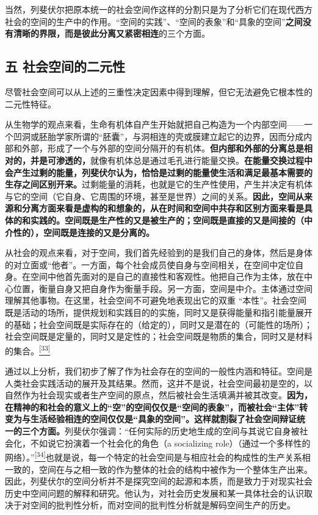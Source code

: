 \documentclass[UTF8, fontset = sourcesans, a4paper, oneside, zihao =
-4, scheme=chinese, no-math, space=true]{ctexbook}
\begin{document}
当然，列斐伏尔把原本统一的社会空间作这样的分割只是为了分析它们在现代西方社会的空间的生产中的作用。``空间的实践''、``空间的表象''和``具象的空间''\textbf{之间没有清晰的界限，而是彼此分离又紧密相连}的三个方面。

\subsection{五
社会空间的二元性}\label{part0006_split_002.htmlux5cux23c020}

尽管社会空间可以从上述的三重性决定因素中得到理解，但它无法避免它根本性的二元性特征。

从生物学的观点来看，生命有机体自产生开始就把自己构造为一个内部空间------一个凹洞或胚胎学家所谓的``胚囊''，与洞相连的壳或膜建立起它的边界，因而分成内部和外部，形成了一个与外部的空间分隔开的有机体。\textbf{但内部和外部的分离总是相对的，并是可渗透的，}就像有机体总是通过毛孔进行能量交换。\textbf{在能量交换过程中会产生过剩的能量，列斐伏尔认为，恰恰是过剩的能量使生活和满足最基本需要的生存之间区别开来。}过剩能量的消耗，也就是它的生产性使用，产生并决定有机体与它的空间（它自身、它周围的环境，甚至是世界）之间的关系。\textbf{因此，空间从来源和分离方面来看是虚构的和想象的，从在时间和空间中共存和区别方面来看是具体的和实践的。空间既是生产性的又是被生产的；空间既是直接的又是间接的（中介性的），空间既是连接的又是分离的。}

从社会的观点来看，对于空间，我们首先经验到的是我们自己的身体，然后是身体的对立面或``他者''。一方面，每个社会成员使自身与空间相关，在空间中定位自身。在空间中他首先面对的是自己的直接性和客观性。他把自己作为主体，放在中心位置，衡量自身又把自身作为衡量手段。另一方面，空间是中介。主体通过空间理解其他事物。在这里，社会空间不可避免地表现出它的双重
``本性''。社会空间既是活动的场所，提供规划和实践目的的实施，同时又是获得能量和指引能量展开的基础；社会空间既是实际存在的（给定的），同时又是潜在的（可能性的场所）；社会空间既是定量的，同时又是定性的；社会空间既是物质的集合，同时又是材料的集合。\protect\hypertarget{part0006_split_002.htmlux5cux23w33}{}{}\protect\hyperlink{part0006_split_003.htmlux5cux23m33}{\textsuperscript{{[}33{]}}}

通过以上分析，我们初步了解了作为社会存在的空间的一般性内涵和特征。空间是人类社会实践活动的展开及其结果。然而，这并不是说，社会空间最初是空的，以自然作为社会现实或者生产空间的原点，然后被社会生活填满并被其改变。\textbf{因为，在精神的和社会的意义上的``空''的空间仅仅是``空间的表象''，而被社会``主体''转变为与生活经验相连的空间仅仅是``具象的空间''。这样就割裂了社会空间辩证统一的三个方面。}列斐伏尔强调：``任何实际的历史地生成的空间与其说它自身被社会化，不如说它扮演着一个社会化的角色（a
socializing
role）（通过一个多样性的网络）。''\protect\hypertarget{part0006_split_002.htmlux5cux23w34}{}{}\protect\hyperlink{part0006_split_003.htmlux5cux23m34}{\textsuperscript{{[}34{]}}}也就是说，每一个特定的社会空间是与相应社会的构成性的生产关系相一致的，空间在与之相一致的作为整体的社会的结构中被作为一个整体生产出来。因此，列斐伏尔的空间分析并不是探究空间的起源和本质，而是致力于对现实社会历史中空间问题的解释和研究。他认为，对社会历史发展和某一具体社会的认识取决于对空间的批判性分析，而对空间的批判性分析就是解码空间生产的历史。
\end{document}
